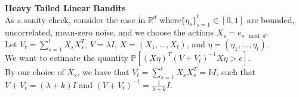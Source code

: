 \documentclass[10pt]{article}
\theoremstyle{plain}%
\theoremstyle{definition}
\newcommand{\R}{\mathbb{R}}
\newcommand{\<}{\langle}
\renewcommand{\>}{\rangle}
\renewcommand{\[}{\left[}
\renewcommand{\]}{\right]}
\renewcommand{\(}{\left(}
\renewcommand{\)}{\right)}
\newcommand{\eps}{\epsilon}
\renewcommand{\P}{\mathbb{P}}
\begin{document}
{\bf Heavy Tailed Linear Bandits}\\

As a sanity check, consider the case in $\R^d$ where$\{\eta_s\}_{s=1}^t \in [0,1]$ are bounded, uncorrelated, mean-zero noise, and we choose the actions
$X_s = e_{s \mod d}$. \\

Let $V_t = \sum_{s=1}^t X_s X_s^T$, $V = \lambda I$, $X=(X_1,\ldots, X_t)$, and $\eta = (\eta_1,\ldots,\eta_t)$.\\

We want to estimate the quantity $\P[(X\eta)^T (V+V_t)^{-1}X\eta > \eps]$.\\

By our choice of $X_s$, we have that $V_t = \sum_{s=1}^t X_s X_s^T = kI$, such that $V+V_t = (\lambda + k) I$ and $(V+V_t)^{-1} = \frac{1}{\lambda + k} I$. \\
\end{document}
